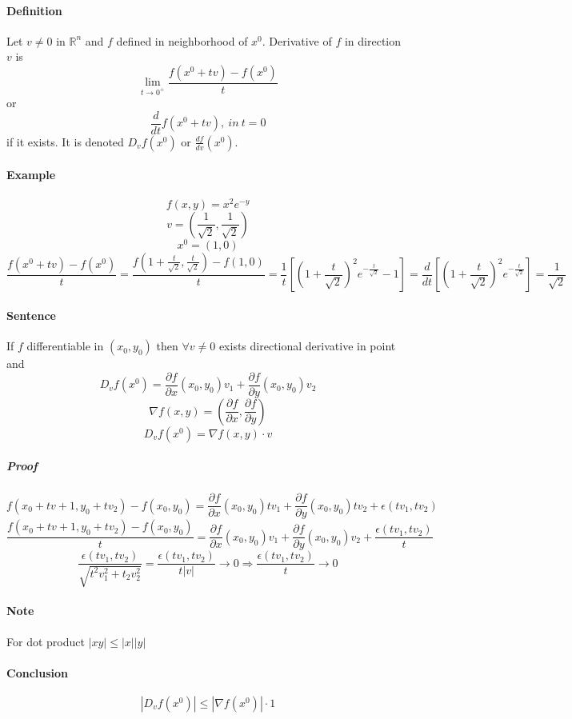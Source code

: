 \paragraph{Definition}
Let $v \neq 0$ in $\mathbb{R}^n$ and $f$ defined in neighborhood of $x^0$. Derivative of $f$ in direction $v$ is
$$\lim_{t \to 0^+} \frac{f(x^0+tv)-f(x^0)}{t}$$
or
$$\frac{d}{dt} f(x^0+tv), \: in \: t=0$$
if it exists. It is denoted $D_v f(x^0)$ or $\frac{df}{dv}(x^0)$.
\paragraph{Example}
$$f(x,y) = x^2e^{-y}$$
$$v = \left(\frac{1}{\sqrt{2}}, \frac{1}{\sqrt{2}}\right)$$
$$x^0 = (1,0)$$
$$\frac{f(x^0+tv)-f(x^0)}{t} = \frac{f(1+\frac{t}{\sqrt{2}},\frac{t}{\sqrt{2}})-f(1,0)}{t} = \frac{1}{t}\left[ \left(1+\frac{t}{\sqrt{2}}\right)^2e^{-\frac{t}{\sqrt{2}}} - 1 \right] = \frac{d}{dt} \left[ \left(1+\frac{t}{\sqrt{2}}\right)^2e^{-\frac{t}{\sqrt{2}}} \right] = \frac{1}{\sqrt{2}}$$
\paragraph{Sentence}
If $f$ differentiable in $(x_0,y_0)$ then $\forall v \neq 0$ exists directional derivative in point and
$$D_v f(x^0) = \frac{\partial f}{\partial x}(x_0, y_0)v_1 + \frac{\partial f}{\partial y}(x_0, y_0)v_2$$
$$\nabla f(x,y) = \left(\frac{\partial f}{\partial x}, \frac{\partial f}{\partial y}\right)$$
$$D_v f(x^0) = \nabla f(x,y) \cdot v$$

\subparagraph{Proof}
$$f(x_0+tv+1, y_0+tv_2) - f(x_0, y_0) = \frac{\partial f}{\partial x}(x_0,y_0)tv_1 + \frac{\partial f}{\partial y }(x_0,y_0)tv_2 + \epsilon (tv_1, tv_2)$$
$$\frac{f(x_0+tv+1, y_0+tv_2) - f(x_0, y_0) }{t} = \frac{\partial f}{\partial x}(x_0,y_0)v_1 + \frac{\partial f}{\partial y }(x_0,y_0)v_2 +\frac{ \epsilon (tv_1, tv_2)}{t}$$
$$\frac{ \epsilon (tv_1, tv_2)}{\sqrt{t^2v_1^2+t_2v_2^2}} = \frac{ \epsilon (tv_1, tv_2)}{t|v|} \to 0 \Rightarrow \frac{ \epsilon (tv_1, tv_2)}{t} \to 0$$
\paragraph{Note} For dot product $|xy| \leq |x||y|$
\paragraph{Conclusion} 
$$\left| D_v f(x^0) \right| \leq \left|\nabla f(x^0)\right|\cdot 1$$